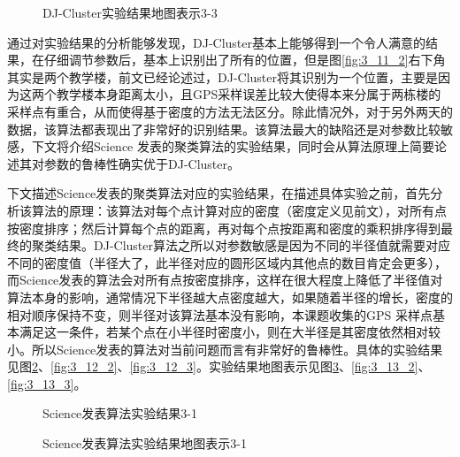 \begin{figure}[htb]
  \centering%
  \hspace{4em}%
  \caption{DJ-Cluster实验结果地图表示3-3}
  \label{fig:3_11_3}
\end{figure}
\par 通过对实验结果的分析能够发现，DJ-Cluster基本上能够得到一个令人满意的结果，在仔细调节参数后，基本上识别出了所有的位置，但是图\ref{fig:3_11_2}右下角其实是两个教学楼，前文已经论述过，DJ-Cluster将其识别为一个位置，主要是因为这两个教学楼本身距离太小，且GPS采样误差比较大使得本来分属于两栋楼的采样点有重合，从而使得基于密度的方法无法区分。除此情况外，对于另外两天的数据，该算法都表现出了非常好的识别结果。该算法最大的缺陷还是对参数比较敏感，下文将介绍Science 发表的聚类算法的实验结果，同时会从算法原理上简要论述其对参数的鲁棒性确实优于DJ-Cluster。
\par 下文描述Science发表的聚类算法对应的实验结果，在描述具体实验之前，首先分析该算法的原理：该算法对每个点计算对应的密度（密度定义见前文），对所有点按密度排序；然后计算每个点的距离，再对每个点按距离和密度的乘积排序得到最终的聚类结果。DJ-Cluster算法之所以对参数敏感是因为不同的半径值就需要对应不同的密度值（半径大了，此半径对应的圆形区域内其他点的数目肯定会更多），而Science发表的算法会对所有点按密度排序，这样在很大程度上降低了半径值对算法本身的影响，通常情况下半径越大点密度越大，如果随着半径的增长，密度的相对顺序保持不变，则半径对该算法基本没有影响，本课题收集的GPS 采样点基本满足这一条件，若某个点在小半径时密度小，则在大半径是其密度依然相对较小。所以Science发表的算法对当前问题而言有非常好的鲁棒性。具体的实验结果见图\ref{fig:3_12_1}、\ref{fig:3_12_2}、\ref{fig:3_12_3}。实验结果地图表示见图\ref{fig:3_13_1}、\ref{fig:3_13_2}、\ref{fig:3_13_3}。
\begin{figure}[htb]
  \centering%
  \hspace{4em}%
  \caption{Science发表算法实验结果3-1}
  \label{fig:3_12_1}
\end{figure}
\begin{figure}[htb]
  \centering%
  \hspace{4em}%
  \caption{Science发表算法实验结果地图表示3-1}
  \label{fig:3_13_1}
\end{figure}
